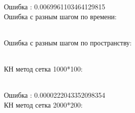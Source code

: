 \documentclass[12pt]{article}
\begin{document}
\begin{enumerate}
        Ошибка : 0.0069961103464129815
        \\  Ошибка с разным шагом по времени:
        \begin{figure}[h]
            \label{ris:image}
        \end{figure}\\
        \newpage
        Ошибка с разным шагом по пространству:
        \begin{figure}[h]
            \label{ris:image}
        \end{figure}\\

        КН метод сетка 1000*100: 
        \begin{figure}[!h]
            \label{ris:image}
        \end{figure}\\
        Ошибка : 0.0000222043352098354
        \\КН метод сетка 2000*200: 
        \begin{figure}[!h]
            \label{ris:image}
        \end{figure}\\
        

\end{enumerate}
\end{document}
